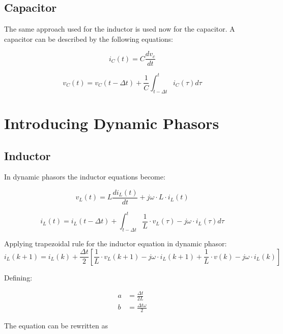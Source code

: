 \subsection{Capacitor} \label{ResistiveCompanionCapacitor}

The same approach used for the inductor is used now for the capacitor.
A capacitor can be described by the following equations:

\begin{equation}
	i_C(t)= C \frac{d v_c}{dt}
\end{equation}

\begin{equation}
	v_C(t)= v_C(t - \Delta t) + \frac{1}{C} \int_{t - \Delta t}^{t} i_C (\tau) d \tau
\end{equation}


\section{Introducing Dynamic Phasors}

\subsection{Inductor}

In dynamic phasors the inductor equations become:

\begin{equation}
        v_L(t) = L \frac{di_L(t)}{dt} + j \omega \cdot L \cdot  i_L(t)
\end{equation}

\begin{equation}
        i_L(t) = i_L(t- \Delta t) +  \int_{t- \Delta t}^{t} \frac{1}{L} \cdot v_L(\tau) -j \omega \cdot i_L(\tau)d \tau 
\end{equation}

Applying trapezoidal rule for the inductor equation in dynamic phasor:
\begin{equation}
        i_L(k+1) = i_L(k) + \frac{\Delta t}{2} \left[ \frac{1}{L} \cdot v_L(k+1) - j \omega \cdot i_L(k+1) + \frac{1}{L} \cdot v(k) - j \omega \cdot i_L(k) \right]
\end{equation}

Defining:

\begin{align}
	a &= \frac{\Delta t}{2L} \\
	b &= \frac{\Delta t \omega}{2}
\end{align}
		
The equation can be rewritten as

